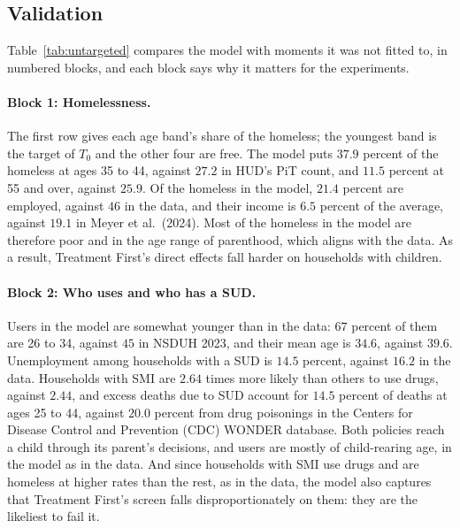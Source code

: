 \documentclass[10pt]{article}
\begin{document}
\subsection{Validation}\label{sec:fvalid}

Table~\ref{tab:untargeted} compares the model with moments it was not fitted to, in numbered blocks, and each block says why it matters for the experiments.

\paragraph{Block 1: Homelessness.} The first row gives each age band's share of the homeless; the youngest band is the target of $T_0$ and the other four are free. The model puts $37.9$ percent of the homeless at ages 35 to 44, against $27.2$ in HUD's PiT count, and $11.5$ percent at 55 and over, against $25.9$. Of the homeless in the model, $21.4$ percent are employed, against $46$ in the data, and their income is $6.5$ percent of the average, against $19.1$ in Meyer et al.\ (2024).   Most of the homeless in the model are therefore poor and in the age range of parenthood, which aligns with the data.  As a result, Treatment First's direct effects fall harder on households with children.

 

\paragraph{Block 2: Who uses and who has a SUD.} Users in the model are somewhat younger than in the data: $67$ percent of them are 26 to 34, against $45$ in NSDUH 2023, and their mean age is $34.6$, against $39.6$. Unemployment among households with a SUD is $14.5$ percent, against $16.2$ in the data. Households with SMI are $2.64$ times more likely than others to use drugs, against $2.44$, and excess deaths due to SUD account for $14.5$ percent of deaths at ages 25 to 44, against $20.0$ percent from drug poisonings in the Centers for Disease Control and Prevention (CDC) WONDER database. Both policies reach a child through its parent's decisions, and users are mostly of child-rearing age, in the model as in the data. And since households with SMI use drugs and are homeless at higher rates than the rest, as in the data, the model also captures that Treatment First's screen falls disproportionately on them: they are the likeliest to fail it.
\end{document}
